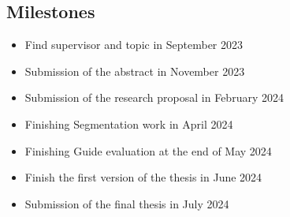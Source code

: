 \subsection{Milestones}
\begin{body}
	\begin{itemize}
		\item[\ding{110}] Find supervisor and topic in September 2023
		\item[\ding{110}] Submission of the abstract in November 2023
		\item[\ding{110}] Submission of the research proposal in February 2024
		\item[\ding{110}] Finishing Segmentation work in April 2024
		\item[\ding{110}] Finishing Guide evaluation at the end of May 2024
		\item[\ding{110}] Finish the first version of the thesis in June 2024
		\item[\ding{110}] Submission of the final thesis in July 2024
	\end{itemize}
\end{body}

